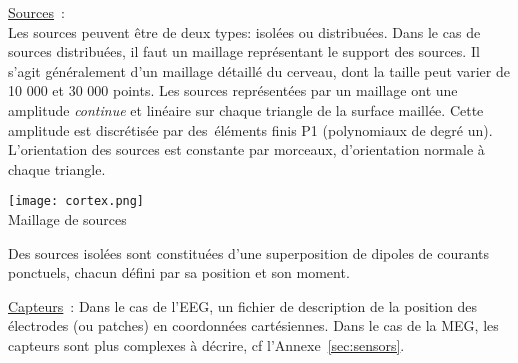\noindent
\underline{Sources}~:\\
Les sources peuvent être de deux types: isolées ou distribuées.
\noindent
Dans le cas de sources distribuées, il faut un maillage représentant le support des sources. Il s'agit généralement d'un maillage détaillé du cerveau, dont la taille peut varier de 10 000 et 30 000 points.
Les sources représentées par un maillage ont une amplitude  {\em continue} et linéaire sur chaque triangle de la surface maillée. Cette amplitude est discrétisée par des éléments finis P1 (polynomiaux de degré un).
L'orientation des sources est constante par morceaux, d'orientation normale à chaque triangle.
\begin{center}
    \texttt{[image: cortex.png]}\\
    Maillage de sources
\end{center}
\noindent
Des sources isolées sont constituées d'une superposition de dipoles de courants ponctuels, chacun défini par sa position et son moment. 

\noindent
\underline{Capteurs}~:
	Dans le cas de l'EEG, un fichier de description de la position des électrodes (ou patches) en coordonnées cartésiennes.
Dans le cas de la MEG, les capteurs sont plus complexes à décrire, cf l'Annexe~\ref{sec:sensors}.

